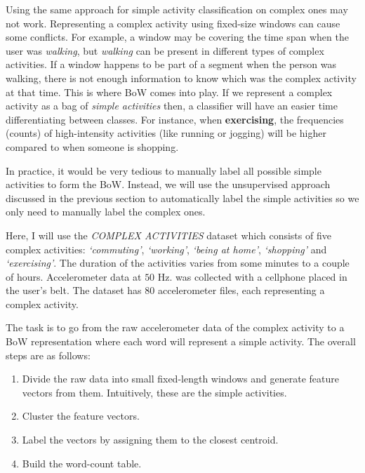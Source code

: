 \documentclass[
  11pt,
]{krantz}
\providecommand{\tightlist}{%
  \setlength{\itemsep}{0pt}\setlength{\parskip}{0pt}}
\begin{document}
Using the same approach for simple activity classification on complex ones may not work. Representing a complex activity using fixed-size windows can cause some conflicts. For example, a window may be covering the time span when the user was \emph{walking}, but \emph{walking} can be present in different types of complex activities. If a window happens to be part of a segment when the person was walking, there is not enough information to know which was the complex activity at that time. This is where BoW comes into play. If we represent a complex activity as a bag of \emph{simple activities} then, a classifier will have an easier time differentiating between classes. For instance, when \textbf{exercising}, the frequencies (counts) of high-intensity activities (like running or jogging) will be higher compared to when someone is shopping.

In practice, it would be very tedious to manually label all possible simple activities to form the BoW. Instead, we will use the unsupervised approach discussed in the previous section to automatically label the simple activities so we only need to manually label the complex ones.

Here, I will use the \emph{COMPLEX ACTIVITIES} dataset which consists of five complex activities: \emph{`commuting'}, \emph{`working'}, \emph{`being at home'}, \emph{`shopping'} and \emph{`exercising'}. The duration of the activities varies from some minutes to a couple of hours. Accelerometer data at \(50\) Hz. was collected with a cellphone placed in the user's belt. The dataset has \(80\) accelerometer files, each representing a complex activity.

The task is to go from the raw accelerometer data of the complex activity to a BoW representation where each word will represent a simple activity. The overall steps are as follows:

\begin{enumerate}
\def\labelenumi{\arabic{enumi}.}
\tightlist
\item
  Divide the raw data into small fixed-length windows and generate feature vectors from them. Intuitively, these are the simple activities.
\item
  Cluster the feature vectors.
\item
  Label the vectors by assigning them to the closest centroid.
\item
  Build the word-count table.
\end{enumerate}
\end{document}
